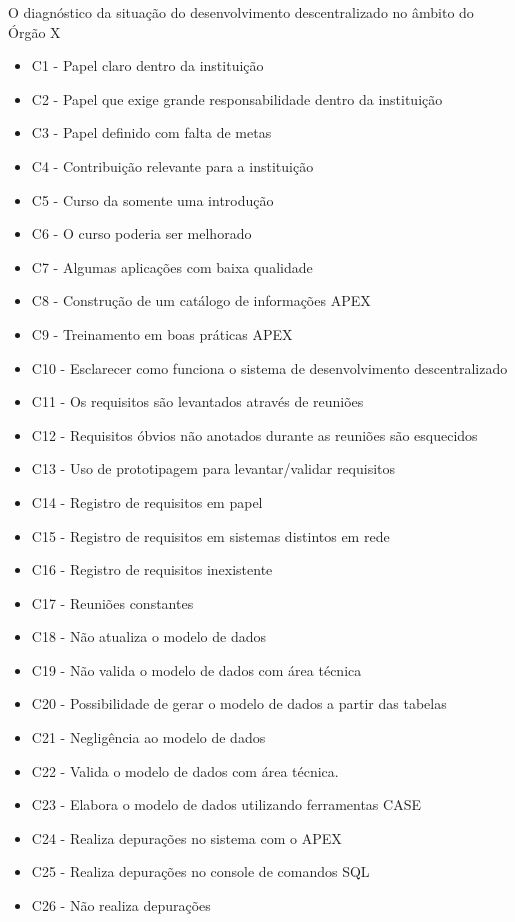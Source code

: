 O diagnóstico da situação do desenvolvimento descentralizado no âmbito do Órgão X

\begin{itemize}
\item C1 - Papel claro dentro da instituição
\item C2 - Papel que exige grande responsabilidade dentro da instituição
\item C3 - Papel definido com falta de metas
\item C4 - Contribuição relevante para a instituição
\item C5 - Curso da somente uma introdução
\item C6 - O curso poderia ser melhorado
\item C7 - Algumas aplicações com baixa qualidade
\item C8 - Construção de um catálogo de informações APEX
\item C9 - Treinamento em boas práticas APEX
\item C10 - Esclarecer como funciona o sistema de desenvolvimento descentralizado
\item C11 - Os requisitos são levantados através de reuniões
\item C12 - Requisitos óbvios não anotados durante as reuniões são esquecidos
\item C13 - Uso de prototipagem para levantar/validar requisitos
\item C14 - Registro de requisitos em papel
\item C15 - Registro de requisitos em sistemas distintos em rede
\item C16 - Registro de requisitos inexistente
\item C17 - Reuniões constantes
\item C18 - Não atualiza o modelo de dados
\item C19 - Não valida o modelo de dados com área técnica
\item C20 - Possibilidade de gerar o modelo de dados a partir das tabelas
\item C21 - Negligência ao modelo de dados
\item C22 - Valida o modelo de dados com área técnica.
\item C23 - Elabora o modelo de dados utilizando ferramentas CASE
\item C24 - Realiza depurações no sistema com o APEX
\item C25 - Realiza depurações no console de comandos SQL
\item C26 - Não realiza depurações

\end{itemize}
